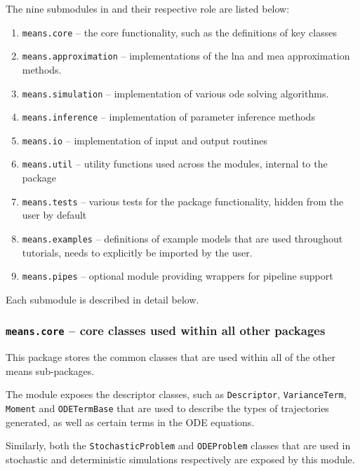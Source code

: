 The nine submodules in \means{} and their respective role are listed below:
\begin{enumerate}
    \item \verb"means.core" -- the core functionality, such as the definitions of key classes
    \item \verb"means.approximation" -- implementations of the \gls{lna} and \gls{mea} approximation methods.
    
    \item \verb"means.simulation" -- implementation of various \gls{ode} solving algorithms.
    \item \verb"means.inference" -- implementation of parameter inference methods
    \item \verb"means.io" -- implementation of input and output routines
    \item \verb"means.util" -- utility functions used across the modules, internal to the package
    \item \verb"means.tests" -- various tests for the package functionality, hidden from the user by default
    \item \verb"means.examples" -- definitions of example models that are used throughout tutorials, needs to explicitly be imported by the user.
    \item \verb"means.pipes" -- optional module providing wrappers for pipeline support
\end{enumerate}

Each submodule is described in detail below.

\subsubsection{{\tt means.core} -- core classes used within all other packages}
This package stores the common classes that are used within all of the other means sub-packages.

The module exposes the descriptor classes, such as \verb"Descriptor",
\verb"VarianceTerm", \verb"Moment" and
\verb"ODETermBase" that are used to describe the types of trajectories generated,
as well as certain terms in the ODE equations.

Similarly, both the \verb"StochasticProblem" and
\verb"ODEProblem" classes that are used in stochastic and deterministic simulations respectively are exposed by this module.

